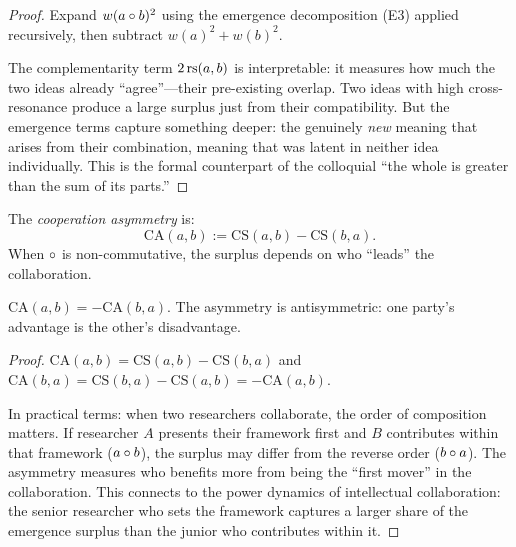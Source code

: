 \begin{proof}
Expand $w(a \circ b)^2$ using the emergence decomposition (E3) applied
recursively, then subtract $w(a)^2 + w(b)^2$.

The complementarity term $2\,\mathrm{rs}(a, b)$ is interpretable: it measures how
much the two ideas already ``agree''---their pre-existing overlap.  Two ideas
with high cross-resonance produce a large surplus just from their compatibility.
But the emergence terms capture something deeper: the genuinely \emph{new}
meaning that arises from their combination, meaning that was latent in neither
idea individually.  This is the formal counterpart of the colloquial ``the
whole is greater than the sum of its parts.''
\end{proof}

\begin{definition}
\label{def:cooperation-asymmetry}
The \emph{cooperation asymmetry} is:
\[
  \text{CA}(a, b) := \text{CS}(a, b) - \text{CS}(b, a).
\]
When $\circ$ is non-commutative, the surplus depends on who ``leads''
the collaboration.
\end{definition}

\begin{theorem}
\label{thm:cooperation-antisymm}
$\text{CA}(a, b) = -\text{CA}(b, a)$.  The asymmetry is antisymmetric:
one party's advantage is the other's disadvantage.
\end{theorem}

\begin{proof}
$\text{CA}(a, b) = \text{CS}(a, b) - \text{CS}(b, a)$ and
$\text{CA}(b, a) = \text{CS}(b, a) - \text{CS}(a, b) = -\text{CA}(a, b)$.

In practical terms: when two researchers collaborate, the order of
composition matters.  If researcher $A$ presents their framework first
and $B$ contributes within that framework ($a \circ b$), the surplus
may differ from the reverse order ($b \circ a$).  The asymmetry measures
who benefits more from being the ``first mover'' in the collaboration.
This connects to the power dynamics of intellectual collaboration:
the senior researcher who sets the framework captures a larger share of
the emergence surplus than the junior who contributes within it.
\end{proof}

